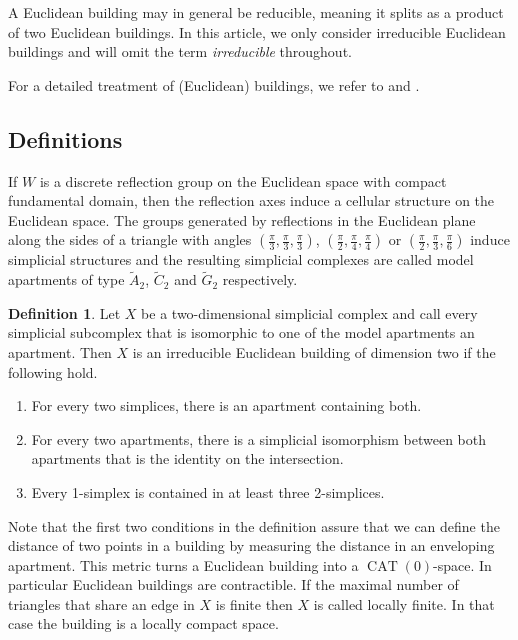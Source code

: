 \documentclass[dvipsnames]{article}
\theoremstyle{definition}
\newtheorem{definition}[theorem]{Definition}
\theoremstyle{remark}
\DeclareMathOperator{\CAT}{CAT}
\begin{document}
    A Euclidean building may in general be reducible, meaning it splits as a product of two Euclidean buildings. In this article, we only consider irreducible Euclidean buildings and will omit the term \textit{irreducible} throughout.
    
    For a detailed treatment of (Euclidean) buildings, we refer to \cite{AbramenkoBrown} and \cite{Rousseau}.
    
    \subsection{Definitions}
    If $W$ is a discrete reflection group on the Euclidean space with compact fundamental domain, then the reflection axes induce a cellular structure on the Euclidean space.
    The groups generated by reflections in the Euclidean plane along the sides of a triangle with angles $(\frac \pi 3, \frac \pi 3, \frac \pi 3)$, $(\frac \pi 2, \frac\pi 4, \frac \pi 4)$ or $(\frac \pi 2, \frac \pi 3, \frac \pi 6)$ induce simplicial structures and the resulting simplicial complexes are called model apartments of type $\tilde A_2$, $\tilde C_2$ and $\tilde G_2$ respectively. 

    \begin{definition}
        Let $X$ be a two-dimensional simplicial complex and call every simplicial subcomplex that is isomorphic to one of the model apartments an apartment. Then $X$ is an irreducible Euclidean building of dimension two if the following hold.
        \begin{enumerate}
            \item For every two simplices, there is an apartment containing both.
            \item For every two apartments, there is a simplicial isomorphism between both apartments that is the identity on the intersection.
            \item Every 1-simplex is contained in at least three 2-simplices.
        \end{enumerate}
    \end{definition}

    Note that the first two conditions in the definition assure that we can define the distance of two points in a building by measuring the distance in an enveloping apartment. This metric turns a Euclidean building into a $\CAT(0)$-space. In particular Euclidean buildings are contractible. If the maximal number of triangles that share an edge in $X$ is finite then $X$ is called locally finite. In that case the building is a locally compact space.
\end{document}
